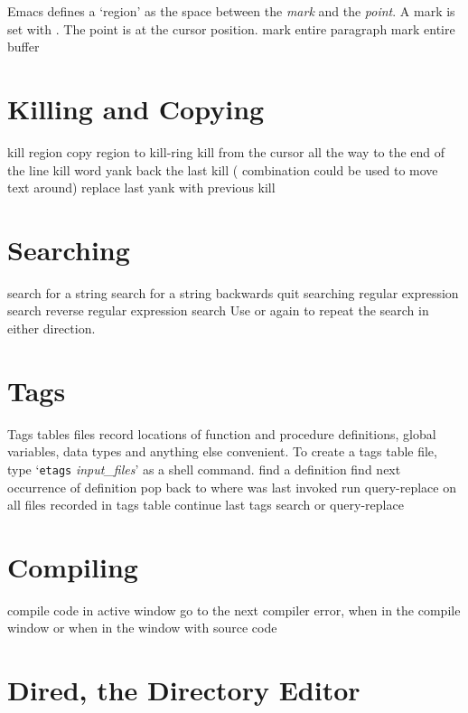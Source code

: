 Emacs defines a `region' as the space between the {\it mark\/} and
the {\it point}. A mark is set with .
The point is at the cursor position.
\askip
{} mark entire paragraph
 mark entire buffer

\section{Killing and Copying}

 kill region
 copy region to kill-ring
 kill from the cursor all the way to the end of the line
 kill word
 yank back the last kill ( combination could be
  used to move text around)
 replace last yank with previous kill

\section{Searching}

 search for a string
 search for a string backwards
 quit searching
 regular expression search
 reverse regular expression search
\askip
Use  or  again to repeat the search in either direction.

\section{Tags}

Tags tables files record locations of function and
procedure definitions, global variables, data types and anything
else convenient. To create a tags table file, type
`{\tt etags} {\it input\_files}' as a shell command.
\askip
{} find a definition
 find next occurrence of definition
 pop back to where  was last invoked
 run query-replace on all files
  recorded in tags table
 continue last tags search or query-replace

\section{Compiling}

 compile code in active window
 go to the next compiler error, when in
  the compile window or
 when in the window with source code

\section{Dired, the Directory Editor}

